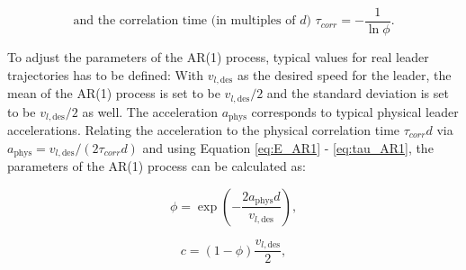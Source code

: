 \documentclass[review]{elsarticle}
\providecommand{\martin}[1]{#1}                  %
\providecommand{\martinc}[1]{}                  %
\providecommand{\sub}[1]{_{\mathrm{#1}}}  %
\providecommand{\3}{{\ss}}
\begin{document}
\begin{equation}
\label{eq:tau_AR1}
\text{and the correlation time (in multiples of $d$) }\tau_{corr} = -\frac{1}{\ln \phi}. 
\end{equation}
 \martinc{Die Variable $\tau$ ist doppelt verwirrend: Erstens steht sie
   in der RL-Literatur oft f\"ur eine Trajektorie, zweitens wird sie
   hier doppelt verwendet: correlation time und ``Soft target update'' (Table~1)}
To adjust the parameters of the AR(1) process, typical values for real
leader trajectories has to be defined: With $v_{l,\text{des}}$ as the
desired speed for the leader, the mean of the AR(1) process is set to
be $v_{l,\text{des}}/2$ and the standard deviation is set to be
$v_{l,\text{des}}/2$ \martin{as well}. The acceleration $a\sub{phys}$ corresponds to
typical physical leader accelerations. Relating the acceleration to
the physical correlation time $\tau_{corr} d$ via 
$a\sub{phys}=v_{l,\text{des}}/(2\tau_{corr} d)$  and using Equation \eqref{eq:E_AR1} - \eqref{eq:tau_AR1}, the parameters of the AR(1) process can be calculated as:

\begin{equation}
\phi = \exp\left(-\frac{2a\sub{phys}d}{v_{l,\text{des}}}\right),
\end{equation}

\begin{equation}
c=(1-\phi)\frac{v_{l,\text{des}}}{2},
\end{equation}
\end{document}
